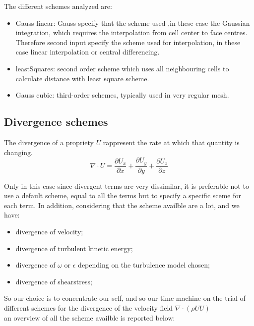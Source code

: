 \documentclass[a4paper,12pt]{article}
\begin{document}
The different schemes analyzed are:
\begin{itemize} 
 \item {\ttfamily Gauss linear}: Gauss specify that the scheme used ,in these case the Gaussian integration, which requires the interpolation from cell center to face centres. Therefore second input specify the scheme used for interpolation, in these case linear interpolation or central differencing.
 
 \item {\ttfamily leastSquares}: second order scheme which uses all neighbouring cells to calculate distance with least square scheme.
 
 \item {\ttfamily Gauss cubic}: third-order schemes, typically used in very regular mesh.
 \end{itemize} 
 
\subsection{Divergence schemes}
The divergence of a propriety $U$ rappresent the rate at which that quantity is changing.
\begin{equation}
 \nabla \cdot U = \frac{\partial U_x}{\partial x}+ \frac{\partial U_y}{\partial y} + \frac{\partial U_z}{\partial z} 
\end{equation}


Only in this case since divergent terms are very dissimilar, it is preferable not to use a default scheme, equal to all the terms but to specify a specific sceme for each term. In addition, considering that the scheme availble are a lot, and we have:
\begin{itemize} 
 \item divergence of velocity;
 \item divergence of turbulent kinetic energy;
 \item divergence of $\omega$ or $\epsilon$ depending on the turbulence model chosen;
 \item divergence of shearstress;

\end{itemize} 
So our choice is to concentrate our self, and so our time machine on the trial of different schemes for the divergence of the velocity field
 $ \nabla \cdot ( \rho UU )$
\\ an overview of all the scheme availble is reported below:
\end{document}
